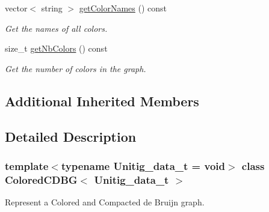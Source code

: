 \begin{DoxyCompactItemize}
vector$<$ string $>$ \hyperlink{classColoredCDBG_ae628f30cb64ba6047585c3df87ac344c}{get\+Color\+Names} () const
\begin{DoxyCompactList}\small\item\em Get the names of all colors. \end{DoxyCompactList}\item 
size\+\_\+t \hyperlink{classColoredCDBG_a53c723997265f89ab284433670ab54f9}{get\+Nb\+Colors} () const
\begin{DoxyCompactList}\small\item\em Get the number of colors in the graph. \end{DoxyCompactList}\end{DoxyCompactItemize}
\subsection*{Additional Inherited Members}


\subsection{Detailed Description}
\subsubsection*{template$<$typename Unitig\+\_\+data\+\_\+t = void$>$\newline
class Colored\+C\+D\+B\+G$<$ Unitig\+\_\+data\+\_\+t $>$}

Represent a Colored and Compacted de Bruijn graph. 

